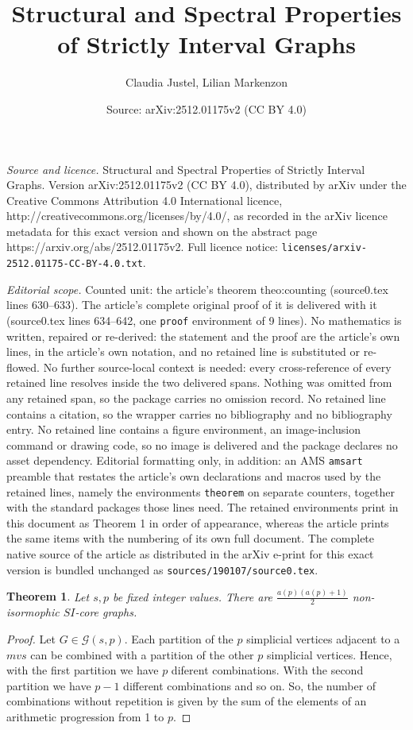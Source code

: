 \documentclass[10pt,a4paper]{amsart}
\title{Structural and Spectral Properties of Strictly Interval Graphs}
\author{Claudia Justel, Lilian Markenzon}
\date{Source: arXiv:2512.01175v2 (CC BY 4.0)}
\newtheorem{theorem}{Theorem}
\begin{document}
\maketitle

\noindent\emph{Source and licence.} Structural and Spectral Properties of Strictly Interval Graphs. Version arXiv:2512.01175v2 (CC BY 4.0), distributed by arXiv under the Creative Commons Attribution 4.0 International licence, http://creativecommons.org/licenses/by/4.0/, as recorded in the arXiv licence metadata for this exact version and shown on the abstract page https://arxiv.org/abs/2512.01175v2. Full licence notice: \texttt{licenses/arxiv-2512.01175-CC-BY-4.0.txt}.\par\smallskip

\noindent\textit{Editorial scope.} Counted unit: the article's theorem theo:counting (source0.tex lines 630--633). The article's complete original proof of it is delivered with it (source0.tex lines 634--642, one \texttt{proof} environment of 9 lines). No mathematics is written, repaired or re-derived: the statement and the proof are the article's own lines, in the article's own notation, and no retained line is substituted or re-flowed.  No further source-local context is needed: every cross-reference of every retained line resolves inside the two delivered spans.  Nothing was omitted from any retained span, so the package carries no omission record.  No retained line contains a citation, so the wrapper carries no bibliography and no bibliography entry.  No retained line contains a figure environment, an image-inclusion command or drawing code, so no image is delivered and the package declares no asset dependency.  Editorial formatting only, in addition: an AMS \texttt{amsart} preamble that restates the article's own declarations and macros used by the retained lines, namely the environments \texttt{theorem} on separate counters, together with the standard packages those lines need.  The retained environments print in this document as Theorem 1 in order of appearance, whereas the article prints the same items with the numbering of its own full document.  The complete native source of the article as distributed in the arXiv e-print for this exact version is bundled unchanged as \texttt{sources/190107/source0.tex}.
\begin{theorem}\label{theo:counting}
Let $s,p$ be fixed integer values.
There are $\frac{a(p)(a(p)+1)}{2}$ non-isormophic $SI$-core graphs.  
\end{theorem}

\begin{proof}
Let $G \in {\mathcal G}(s,p)$.
Each partition of the $p$ simplicial vertices adjacent to a $mvs$ can be combined
with a partition of the other $p$ simplicial vertices.
Hence, with the first partition we have $p$ diferent combinations.
With the second partition we have $p-1$ different combinations  and so on.
So, the number of combinations without repetition is given by 
the sum of the elements of an arithmetic progression from 1 to  $p$. 
\end{proof}
\end{document}
